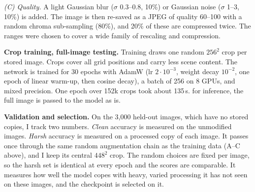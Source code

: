 \noindent\emph{(C) Quality.} A light Gaussian blur ($\sigma$ 0.3--0.8, 10\%) or Gaussian noise ($\sigma$ 1--3, 10\%) is added. The image is then re-saved as a JPEG of quality 60--100 with a random chroma sub-sampling (80\%), and 20\% of these are compressed twice.
The ranges were chosen to cover a wide family of rescaling and compression.

\noindent\textbf{Crop training, full-image testing.} Training draws one random $256^2$ crop per stored image. Crops cover all grid positions and carry less scene content. The network is trained for 30 epochs with AdamW (lr $2\cdot10^{-3}$, weight decay $10^{-2}$, one epoch of linear warm-up, then cosine decay), a batch of 256 on 8 GPUs, and mixed precision. One epoch over 152k crops took about 135\,s. for inference, the full image is passed to the model as is.

\noindent\textbf{Validation and selection.} On the 3,000 held-out images, which have no stored copies, I track two numbers. \emph{Clean} accuracy is measured on the unmodified images. \emph{Harsh} accuracy is measured on a processed copy of each image. It passes once through the same random augmentation chain as the training data (A--C above), and I keep its central $448^2$ crop. The random choices are fixed per image, so the harsh set is identical at every epoch and the scores are comparable. It measures how well the model copes with heavy, varied processing it has not seen on these images, and the checkpoint is selected on it.
